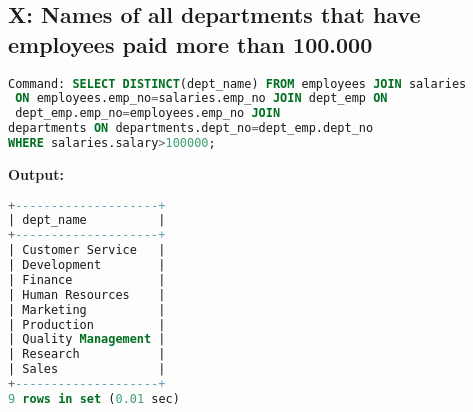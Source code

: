 \documentclass[12pt]{report}
\begin{document}
\subsection*{X: Names of all departments that have employees paid more
than 100.000}

\begin{lstlisting}[language=sql]
Command: SELECT DISTINCT(dept_name) FROM employees JOIN salaries
 ON employees.emp_no=salaries.emp_no JOIN dept_emp ON 
 dept_emp.emp_no=employees.emp_no JOIN 
departments ON departments.dept_no=dept_emp.dept_no 
WHERE salaries.salary>100000;
\end{lstlisting}
\textbf{Output:}
\begin{lstlisting}[language=sql]
+--------------------+
| dept_name          |
+--------------------+
| Customer Service   |
| Development        |
| Finance            |
| Human Resources    |
| Marketing          |
| Production         |
| Quality Management |
| Research           |
| Sales              |
+--------------------+
9 rows in set (0.01 sec)

\end{lstlisting}
\end{document}
